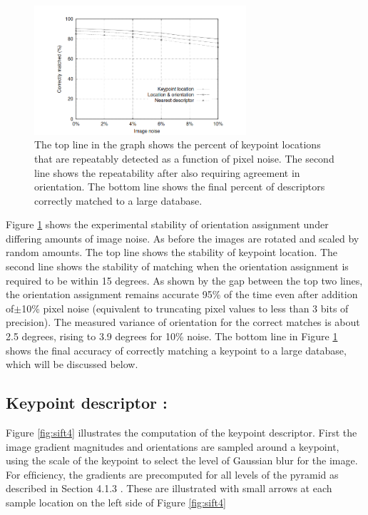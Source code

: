 \begin{figure}[H]
\centering
\includegraphics[width=0.7\textwidth]{img/sift3.PNG}
\caption{ The top line in the graph shows the percent of keypoint locations that are repeatably
detected as a function of pixel noise. The second line shows the repeatability after also requiring
agreement in orientation. The bottom line shows the ﬁnal percent of descriptors correctly matched
to a large database.}
\label{fig:sift3}
\end{figure}

Figure \ref{fig:sift3} shows the experimental stability of orientation assignment under differing
amounts of image noise. As before the images are rotated and scaled by random amounts.
The top line shows the stability of keypoint location. The second line shows the stability of
matching when the orientation assignment is required to be within 15 degrees. As shown
by the gap between the top two lines, the orientation assignment remains accurate 95\% of
the time even after addition of$ \pm$10\% pixel noise (equivalent to truncating pixel values to
less than 3 bits of precision). The measured variance of orientation for the correct matches
is about 2.5 degrees, rising to 3.9 degrees for 10\% noise. The bottom line in Figure \ref{fig:sift3}
shows the final accuracy of correctly matching a keypoint to a large database, which will
be discussed below.

\subsection{Keypoint descriptor :}

Figure \ref{fig:sift4} illustrates the computation of the keypoint descriptor. First the image gradient
magnitudes and orientations are sampled around a keypoint, using the scale of the keypoint
to select the level of Gaussian blur for the image. For efﬁciency, the gradients are precomputed
for all levels of the pyramid as described in Section 4.1.3 . These are illustrated with
small arrows at each sample location on the left side of Figure \ref{fig:sift4}

